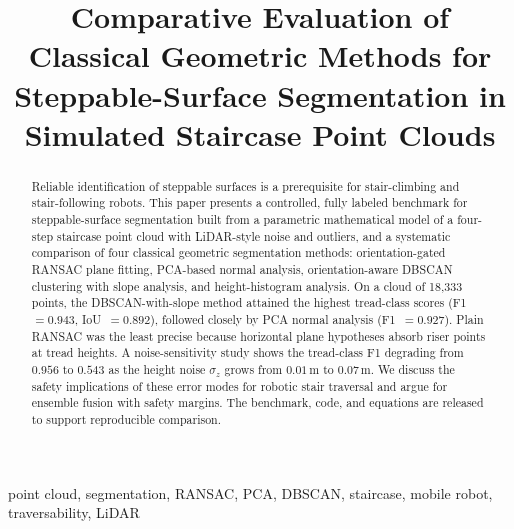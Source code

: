 \documentclass[conference]{IEEEtran}
\begin{document}
\title{Comparative Evaluation of Classical Geometric Methods for
Steppable-Surface Segmentation in Simulated Staircase Point Clouds}

\author{
}

\maketitle

\begin{abstract}
Reliable identification of steppable surfaces is a prerequisite for
stair-climbing and stair-following robots. This paper presents a controlled,
fully labeled benchmark for steppable-surface segmentation built from a
parametric mathematical model of a four-step staircase point cloud with
LiDAR-style noise and outliers, and a systematic comparison of four classical
geometric segmentation methods: orientation-gated RANSAC plane fitting,
PCA-based normal analysis, orientation-aware DBSCAN clustering with slope
analysis, and height-histogram analysis. On a cloud of 18{,}333 points, the
DBSCAN-with-slope method attained the highest tread-class scores
(F1~$=0.943$, IoU~$=0.892$), followed closely by PCA normal analysis
(F1~$=0.927$). Plain RANSAC was the least precise because horizontal plane
hypotheses absorb riser points at tread heights. A noise-sensitivity study
shows the tread-class F1 degrading from $0.956$ to $0.543$ as the height
noise $\sigma_z$ grows from $0.01$\,m to $0.07$\,m. We discuss the safety
implications of these error modes for robotic stair traversal and argue for
ensemble fusion with safety margins. The benchmark, code, and equations are
released to support reproducible comparison.
\end{abstract}

\begin{IEEEkeywords}
point cloud, segmentation, RANSAC, PCA, DBSCAN, staircase, mobile robot,
traversability, LiDAR
\end{IEEEkeywords}









\end{document}
